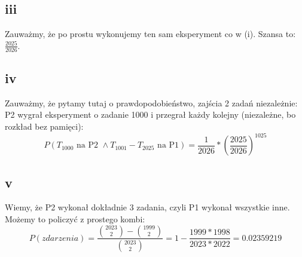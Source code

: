\subsection{iii}
Zauważmy, że po prostu wykonujemy ten sam eksperyment co w (i). Szansa to: \(\frac{2025}{2026}\).
\subsection{iv}
Zauważmy, że pytamy tutaj o prawdopodobieństwo, zajścia 2 zadań niezależnie: P2 wygrał eksperyment o zadanie 1000 i przegrał każdy kolejny (niezależne, bo rozkład bez pamięci):
\[P(T_{1000} \mbox{ na P2 } \wedge T_{1001}-T_{2025} \mbox{ na P1}) = \frac{1}{2026} * \left( \frac{2025}{2026} \right)^{1025} \]
\subsection{v}
Wiemy, że P2 wykonał dokładnie 3 zadania, czyli P1 wykonał wszystkie inne. Możemy to policzyć z prostego kombi:
\[P(zdarzenia) = \frac{\binom{2023}{2}-\binom{1999}{2}}{\binom{2023}{2}} =1 - \frac{1999*1998}{2023*2022} = 0.02359219 \]
